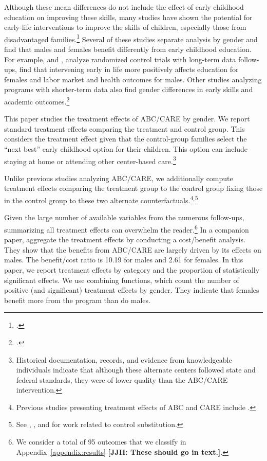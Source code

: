 Although these mean differences do not include the effect of early childhood education on improving these skills, many studies have shown the potential for early-life interventions to improve the skills of children, especially those from disadvantaged families.\footnote{\citet{Currie_2011_AER,Elango_Hojman_etal_2016_Early-Edu}.} Several of these studies separate analysis by gender and find that males and females benefit differently from early childhood education. For example, \citet{Heckman_Moon_etal_2010_QE} and \citet{Garcia_Heckman_Leaf_etal_2017_Comp_CBA_Unpublished}, analyze randomized control trials with long-term data follow-ups, find that intervening early in life more positively affects education for females and labor market and health outcomes for males. Other studies analyzing programs with shorter-term data also find gender differences in early skills and academic outcomes.\footnote{\citet{Deming_2009_AEJAE,Ou_Reynolds_2010_Mechanisms_CYSR,Magnuson_Kelchen_Duncan_etal_2016_ECRQ}.}

This paper studies the treatment effects of ABC/CARE by gender. We report standard treatment effects comparing the treatment and control group. This considers the treatment effect given that the control-group families select the ``next best'' early childhood option for their children. This option can include staying at home or attending other center-based care.\footnote{Historical documentation, records, and evidence from knowledgeable individuals indicate that although these alternate centers followed state and federal standards, they were of lower quality than the ABC/CARE intervention.}

Unlike previous studies analyzing ABC/CARE, we additionally compute treatment effects comparing the treatment group to the control group fixing those in the control group to these two alternate counterfactuals.\footnote{Previous studies presenting treatment effects of ABC and CARE include \citet{Ramey_etal_1985_Project-CARE_TiECSE, Clarke_Campbell_1998_ABC_Comparison_ECRQ,Campbell_Pungello_etal_2001_DP,Campbell_Ramey_etal_2002_ADS,Campbell_Wasik_etal_2008_ECRQ,Campbell_Conti_etal_2014_EarlyChildhoodInvestments}.}$^,$\footnote{See \cite{Heckman_1992_randomization}, \cite{Heckman_Hohmann_etal_2000_QJE}, and \cite{Kline_Walters_2016_QJE} for work related to control substitution.}

Given the large number of available variables from the numerous follow-ups, summarizing all treatment effects can overwhelm the reader.\footnote{We consider a total of 95 outcomes that we classify in Appendix~\ref{appendix:results} \textbf{[JJH: These should go in text.]}.} In a companion paper, \citet{Garcia_Heckman_Leaf_etal_2017_Comp_CBA_Unpublished} aggregate the treatment effects by conducting a cost/benefit analysis. They show that the benefits from ABC/CARE are largely driven by its effects on males. The benefit/cost ratio is 10.19 for males and 2.61 for females. In this paper, we report treatment effects by category and the proportion of statistically significant effects. We use combining functions, which count the number of positive (and significant) treatment effects by gender. They indicate that females benefit more from the program than do males.

